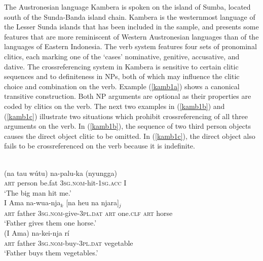 The Austronesian language Kambera is spoken on the island of Sumba, located south of the Sunda-Banda island chain. Kambera is the westernmost language of the Lesser Sunda islands that has been included in the sample, and presents some features that are more reminiscent of Western Austronesian languages than of the languages of Eastern Indonesia. The verb system features four sets of pronominal clitics, each marking one of the `cases' nominative, genitive, accusative, and dative. The crossreferencing system in Kambera is sensitive to certain clitic sequences and to definiteness in NPs, both of which may influence the clitic choice and combination on the verb. Example (\ref{kamb1a}) shows a canonical transitive construction. Both NP arguments are optional as their properties are coded by clitics on the verb. The next two examples in (\ref{kamb1b}) and (\ref{kamb1c}) illustrate two situations which prohibit crossreferencing of all three arguments on the verb. In (\ref{kamb1b}), the sequence of two third person objects causes the direct object clitic to be omitted. In (\ref{kamb1c}), the direct object also fails to be crossreferenced on the verb because it is indefinite.

\ea 
{}\\
\ea \label{kamb1a}
\gll (na tau wútu) na-palu-ka (nyungga) \\
\textsc{art} person be.fat \textsc{3}\textsc{sg}.\textsc{nom}-hit-\textsc{1}\textsc{sg}.\textsc{acc} I \\
\glft `The big man hit me.' \\ 
\ex \label{kamb1b}
\gll I Ama na-wua-nja$_k$ [na heu na njara]$_j$ \\
\textsc{art} father \textsc{3}\textsc{sg}.\textsc{nom}-give-\textsc{3}\textsc{pl}.\textsc{dat} \textsc{art} one.\textsc{clf} \textsc{art} horse \\
\glft `Father gives them one horse.' \\ 
\ex \label{kamb1c}
\gll (I Ama) na-kei-nja rí \\ 
\textsc{art} father \textsc{3}\textsc{sg}.\textsc{nom}-buy-\textsc{3}\textsc{pl}.\textsc{dat} vegetable \\
\glft `Father buys them vegetables.'\\ 
\z
\z

